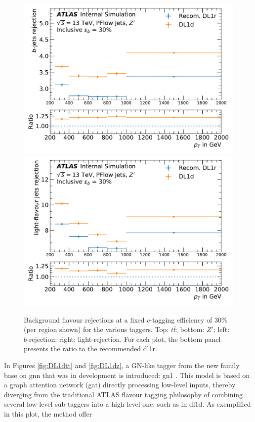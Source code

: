 \begin{center}
\begin{figure}[h!]
\centerline{
\includegraphics[scale=0.425]{Images//FTAG/Reprocessed/plotting_eff_vs_pt_c/pT_vs_beff_c_zp_299.pdf}
\includegraphics[scale=0.425]{Images//FTAG/Reprocessed/plotting_eff_vs_pt_c/pT_vs_beff_u_zp_299.pdf}
}
\caption{Background flavour rejections at a fixed $c$-tagging efficiency of 30\% (per region shown) for the various taggers. Top: $t\bar{t}$; bottom: $Z'$; left: $b$-rejection; right: light-rejection. For each plot, the bottom panel presents the ratio to the recommended \gls{dl1r}.}
\label{fig:ptDL1dz}
\end{figure}
\end{center}

In Figures \ref{fig:DL1dtt} and \ref{fig:DL1dz}, a GN-like tagger from the new family base on \gls{gnn} that was in development is introduced: \gls{gn1} \cite{ATL-PHYS-PUB-2022-027}. This model is based on a graph attention network (\gls{gat}) directly processing low-level inputs, thereby diverging from the traditional ATLAS flavour tagging philosophy of combining several low-level sub-taggers into a high-level one, such as in \gls{dl1d}. As exemplified in this plot, the method offer 



